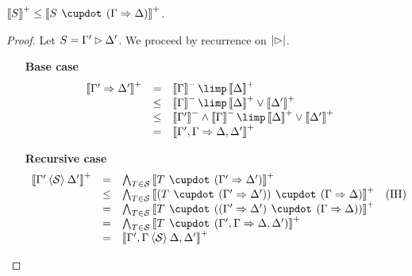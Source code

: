 
\begin{lemma}
  $\psint{S} \sement \psint{S \mix (\Gamma \seq \Delta)}$.
\end{lemma}
\begin{proof}
  Let $S = \Gamma' \mathbin{\rhd} \Delta'$. We proceed by recurrence on $\left|\mathbin{\rhd}\right|$.
  \begin{itemize}
    \item[\textbf{Base case}]
    $$
    \begin{array}{rcll}
      \psint{\Gamma' \seq \Delta'}
      &=& \nsint{\Gamma} \limp \psint{\Delta} & \\
      &\sement& \nsint{\Gamma} \limp \psint{\Delta} \lor \psint{\Delta'} & \\
      &\sement& \nsint{\Gamma'} \wedge \nsint{\Gamma} \limp \psint{\Delta} \lor \psint{\Delta'} & \\
      &=& \psint{\Gamma', \Gamma \seq \Delta, \Delta'} & \\
    \end{array}
    $$
    \item[\textbf{Recursive case}]
    $$
    \begin{array}{rcll}
      \psint{\Gamma' \piq{\cS} \Delta'}
      &=& \bigwedge_{T \in \cS}{\psint{T \mix (\Gamma' \seq \Delta')}} & \\
      &\sement& \bigwedge_{T \in \cS}{\psint{(T \mix (\Gamma' \seq \Delta')) \mix (\Gamma \seq \Delta)}} &\text{(IH)} \\
      &=& \bigwedge_{T \in \cS}{\psint{T \mix ((\Gamma' \seq \Delta') \mix (\Gamma \seq \Delta))}} & \\
      &=& \bigwedge_{T \in \cS}{\psint{T \mix (\Gamma', \Gamma \seq \Delta, \Delta')}} & \\
      &=& \psint{\Gamma', \Gamma \piq{\cS} \Delta, \Delta'} & \\
    \end{array}
    $$
  \end{itemize}
\end{proof}

